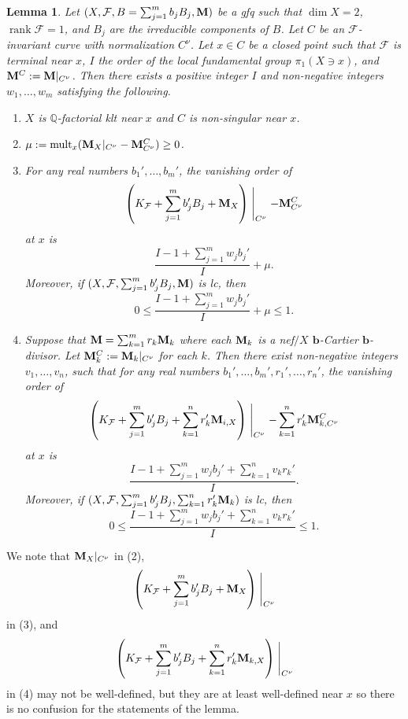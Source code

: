 \documentclass[11pt]{amsart}
\numberwithin{equation}{section}
\newcommand{\bb}{\bm{b}}
\newcommand{\Mm}{{\bf{M}}}
\newcommand{\Qq}{\mathbb{Q}}
\newcommand{\rk}{\operatorname{rank}}
\newcommand{\mult}{\operatorname{mult}}
\newcommand{\Ff}{\mathcal{F}}
\newtheorem{lem}[thm]{Lemma}
\theoremstyle{definition}
\theoremstyle{definition}
\theoremstyle{definition}
\begin{document}
\begin{lem}\label{lem: surface pia terminal}
    Let $(X,\Ff,B=\sum_{j=1}^mb_jB_j,\Mm)$ be a gfq such that $\dim X=2$, $\rk\Ff=1$, and $B_j$ are the irreducible components of $B$. Let $C$ be an $\Ff$-invariant curve with normalization $C^\nu$. Let $x\in C$ be a closed point such that $\Ff$ is terminal near $x$,  $I$ the order of the local fundamental group $\pi_1(X\ni x)$, and $\Mm^C:=\Mm|_{C^\nu}$. Then there exists a positive integer $I$ and non-negative integers $w_1,\dots,w_m$ satisfying the following.
    \begin{enumerate}
        \item $X$ is $\Qq$-factorial klt near $x$ and $C$ is non-singular near $x$. 
        \item $\mu:=\mult_x(\Mm_X|_{C^\nu}-\Mm^C_{C^\nu})\geq 0$.
        \item For any real numbers $b_1',\dots,b_m'$, the vanishing order of
$$\left(K_{\Ff}+\sum_{j=1}^mb_j'B_j+\Mm_X\right)\Biggm|_{C^\nu}-\Mm^C_{C^\nu}$$
        at $x$ is 
        $$\frac{I-1+\sum_{j=1}^mw_jb_j'}{I}+\mu.$$
        Moreover, if $(X,\Ff,\sum_{j=1}^mb_j'B_j,\Mm)$ is lc, then       $$0\leq \frac{I-1+\sum_{j=1}^mw_jb_j'}{I}+\mu\leq 1.$$
        \item Suppose that $\Mm=\sum_{k=1}^mr_k\Mm_k$ where each $\Mm_k$ is a nef$/X$ $\bb$-Cartier $\bb$-divisor. Let $\Mm^C_k:=\Mm_k|_{C^\nu}$ for each $k$. Then there exist non-negative integers $v_1,\dots,v_n$, such that for any real numbers $b_1',\dots,b_m', r_1',\dots,r_n'$, the vanishing order of
$$\left(K_{\Ff}+\sum_{j=1}^mb_j'B_j+\sum_{k=1}^nr_k'\Mm_{i,X}\right)\Biggm|_{C^\nu}-\sum_{k=1}^nr_k'\Mm^C_{k,C^\nu}$$
at $x$ is
$$\frac{I-1+\sum_{j=1}^mw_jb_j'+\sum_{k=1}^nv_kr_k'}{I}.$$
Moreover, if $(X,\Ff,\sum_{j=1}^mb_j'B_j,\sum_{k=1}^nr_k'\Mm_k)$ is lc, then
$$0\leq\frac{I-1+\sum_{j=1}^mw_jb_j'+\sum_{k=1}^nv_kr_k'}{I}\leq 1.$$
    \end{enumerate}
\end{lem}
 We note that $\Mm_X|_{C^\nu}$ in (2), $$\left(K_{\Ff}+\sum_{j=1}^mb_j'B_j+\Mm_X\right)\Biggm|_{C^\nu}$$ in (3), and $$\left(K_{\Ff}+\sum_{j=1}^mb_j'B_j+\sum_{k=1}^nr_k'\Mm_{k,X}\right)\Biggm|_{C^\nu}$$ in (4) may not be well-defined, but they are at least well-defined near $x$ so there is no confusion for the statements of the lemma.
\end{document}
